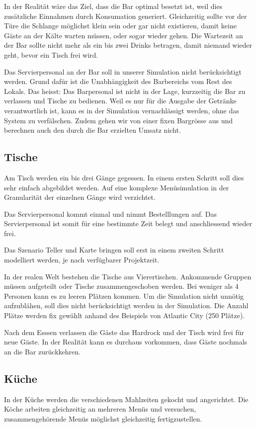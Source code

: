 \documentclass[ngerman,a4paper,12pt]{scrreprt}
\begin{document}
In der Realität wäre das Ziel, dass die Bar optimal besetzt ist, weil dies zusätzliche Einnahmen durch Konsumation generiert. Gleichzeitig sollte vor der Türe die Schlange möglichst klein sein oder gar nicht existieren, damit keine Gäste an der Kälte warten müssen, oder sogar wieder gehen. Die Wartezeit an der Bar sollte nicht mehr als ein bis zwei Drinks betragen, damit niemand wieder geht, bevor ein Tisch frei wird.

Das Servierpersonal an der Bar soll in unserer Simulation nicht berücksichtigt werden. Grund dafür ist die Unabhängigkeit des Barbereichs vom Rest des Lokals. Das heisst: Das Barpersonal ist nicht in der Lage, kurzzeitig die Bar zu verlassen und Tische zu bedienen. Weil es nur für die Ausgabe der Getränke verantwortlich ist, kann es in der Simulation vernachlässigt werden, ohne das System zu verfälschen. Zudem gehen wir von einer fixen Bargrösse aus und berechnen auch den durch die Bar erzielten Umsatz nicht.

\subsection{Tische}
Am Tisch werden ein bis drei Gänge gegessen. In einem ersten Schritt soll dies sehr einfach abgebildet werden. Auf eine komplexe Menüsimulation in der Granularität der einzelnen Gänge wird verzichtet.

Das Servierpersonal kommt einmal und nimmt Bestelllungen auf. Das Servierpersonal ist somit für eine bestimmte Zeit belegt und anschliessend wieder frei. 

Das Szenario Teller und Karte bringen soll erst in einem zweiten Schritt modelliert werden, je nach verfügbarer Projektzeit.

In der realen Welt bestehen die Tische aus Vierertischen. Ankommende Gruppen müssen aufgeteilt oder Tische zusammengeschoben werden. Bei weniger als 4 Personen kann es zu leeren Plätzen kommen. Um die Simulation nicht unnötig aufzublähen, soll dies nicht berücksichtigt werden in der Simulation.
Die Anzahl Plätze werden fix gewählt anhand des Beispiels von Atlantic City (250 Plätze).

Nach dem Esssen  verlassen die Gäste das Hardrock und der Tisch wird frei für neue Gäste.
In der Realität kann es durchaus vorkommen, dass Gäste nochmals an die Bar zurückkehren.


\subsection{Küche}
	In der Küche werden die verschiedenen Mahlzeiten gekocht und angerichtet. Die Köche arbeiten gleichzeitig an mehreren Menüs und versuchen, zusammengehörende Menüs möglichst gleichzeitig fertigzustellen.
\end{document}

